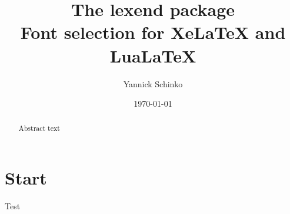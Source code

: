 \documentclass[12pt,oneside,a4paper]{memoir}
\begin{document}
\title{
	The \textsf{lexend} package\\
	\small{Font selection for XeLaTeX and LuaLaTeX}
}
\author{
	Yannick Schinko
}
\date{
	\today\\
}

\maketitle

\begin{abstract}
Abstract text
\end{abstract}

\tableofcontents

\newpage
{}

\chapter{Start}

Test
\end{document}
